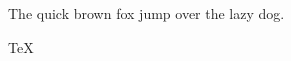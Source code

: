 \begin{englishabstract}
The quick brown fox jump over the lazy dog.

\TeX\index{\TeX}

\englishkeywords{\TeX}

\end{englishabstract}
